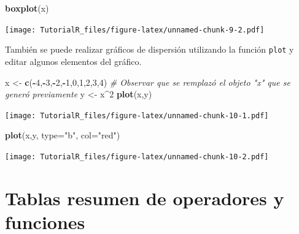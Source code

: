 \documentclass[]{book}
\newenvironment{Shaded}{\begin{snugshade}}{\end{snugshade}}
\newcommand{\KeywordTok}[1]{\textcolor[rgb]{0.13,0.29,0.53}{\textbf{#1}}}
\newcommand{\DataTypeTok}[1]{\textcolor[rgb]{0.13,0.29,0.53}{#1}}
\newcommand{\DecValTok}[1]{\textcolor[rgb]{0.00,0.00,0.81}{#1}}
\newcommand{\StringTok}[1]{\textcolor[rgb]{0.31,0.60,0.02}{#1}}
\newcommand{\CommentTok}[1]{\textcolor[rgb]{0.56,0.35,0.01}{\textit{#1}}}
\newcommand{\OperatorTok}[1]{\textcolor[rgb]{0.81,0.36,0.00}{\textbf{#1}}}
\newcommand{\NormalTok}[1]{#1}
\begin{document}
\begin{Shaded}
\begin{Highlighting}[]
\KeywordTok{boxplot}\NormalTok{(x)}
\end{Highlighting}
\end{Shaded}

\texttt{[image: TutorialR\_files/figure-latex/unnamed-chunk-9-2.pdf]}

También se puede realizar gráficos de dispersión utilizando la función
\texttt{plot} y editar algunos elementos del gráfico.

\begin{Shaded}
\begin{Highlighting}[]
\NormalTok{x <-}\StringTok{ }\KeywordTok{c}\NormalTok{(}\OperatorTok{-}\DecValTok{4}\NormalTok{,}\OperatorTok{-}\DecValTok{3}\NormalTok{,}\OperatorTok{-}\DecValTok{2}\NormalTok{,}\OperatorTok{-}\DecValTok{1}\NormalTok{,}\DecValTok{0}\NormalTok{,}\DecValTok{1}\NormalTok{,}\DecValTok{2}\NormalTok{,}\DecValTok{3}\NormalTok{,}\DecValTok{4}\NormalTok{)  }\CommentTok{# Observar que se remplazó el objeto "x" que se generó previamente}
\NormalTok{y <-}\StringTok{ }\NormalTok{x}\OperatorTok{^}\DecValTok{2}
\KeywordTok{plot}\NormalTok{(x,y)}
\end{Highlighting}
\end{Shaded}

\texttt{[image: TutorialR\_files/figure-latex/unnamed-chunk-10-1.pdf]}

\begin{Shaded}
\begin{Highlighting}[]
\KeywordTok{plot}\NormalTok{(x,y, }\DataTypeTok{type=}\StringTok{"b"}\NormalTok{, }\DataTypeTok{col=}\StringTok{"red"}\NormalTok{)}
\end{Highlighting}
\end{Shaded}

\texttt{[image: TutorialR\_files/figure-latex/unnamed-chunk-10-2.pdf]}

\section{Tablas resumen de operadores y funciones}\label{tablas_resumen}
\end{document}
